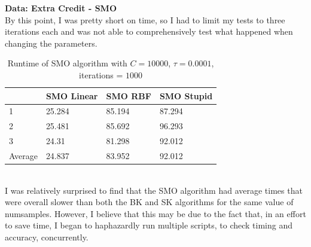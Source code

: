 \documentclass[submit]{harvardml}
\begin{document}
\textbf{Data: Extra Credit - SMO} \\ 
By this point, I was pretty short on time, so I had to limit my tests to three iterations each and was not able to comprehensively test what happened when changing the parameters.
\begin{table}[hbt]
\centering
\caption{Runtime of SMO algorithm with $C = 10000$, $\tau = 0.0001$, iterations = $1000$}
\label{my-label}
\begin{tabular}{l|lll}
        & SMO Linear & SMO RBF & SMO Stupid \\ \hline
1       & 25.284     & 85.194  & 87.294     \\
2       & 25.481     & 85.692  & 96.293     \\
3       & 24.31      & 81.298  & 92.012     \\ \hline
Average & 24.837     & 83.952  & 92.012    
\end{tabular}
\end{table} \\
\noindent I was relatively surprised to find that the SMO algorithm had average times that were overall slower than both the BK and SK algorithms for the same value of numsamples. However, I believe that this may be due to the fact that, in an effort to save time, I began to haphazardly run multiple scripts, to check timing and accuracy, concurrently. \\ \\ \\
\end{document}
